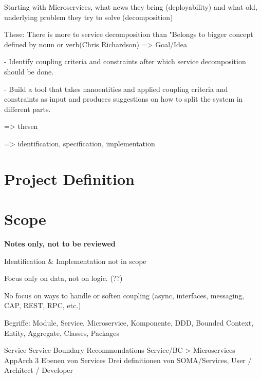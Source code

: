 Starting with Microservices, what news they bring (deployability) and what old, underlying problem they try to solve (decomposition)

These: There is more to service decomposition than "Belongs to bigger concept defined by noun or verb(Chris Richardson)
=> Goal/Idea

- Identify coupling criteria and constraints after which service 
decomposition should be done. 

- Build a tool that takes nanoentities and applied coupling criteria and constraints as input and produces suggestions on how to split the system in different parts. 

=> thesen

=> identification, specification, implementation

\section{Project Definition}



\section{Scope}

\textbf{Notes only, not to be reviewed}

Identification \& Implementation not in scope

Focus only on data, not on logic. (??)

No focus on ways to handle or soften coupling (async, interfaces, messaging, CAP, REST, RPC, etc.)

Begriffe: Module, Service, Microservice, Komponente, DDD, Bounded Context, Entity, Aggregate, Classes, Packages

Service
Service Boundary Recommondations
Service/BC > Microservices 
AppArch 3 Ebenen von Services
Drei definitionen von SOMA/Services, User / Architect / Developer